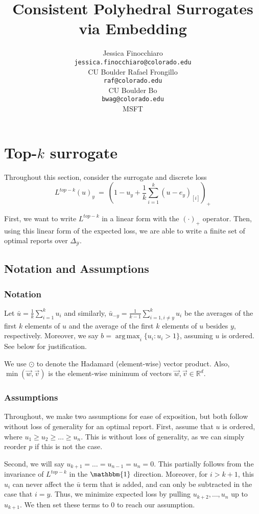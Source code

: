 \documentclass[12pt]{article}
\title{Consistent Polyhedral Surrogates via Embedding}
\author{%
 Jessica Finocchiaro\raf{Jessie?} \\
 \texttt{jessica.finocchiaro@colorado.edu}\\
 CU Boulder
 \And
 Rafael Frongillo\\
 \texttt{raf@colorado.edu}\\
 CU Boulder
 \And
 Bo\\
 \texttt{bwag@colorado.edu}\\
 MSFT
}
\newcommand{\reals}{\mathbb{R}}
\newcommand{\simplex}{\Delta_\Y}
\newcommand{\Y}{\mathcal{Y}}
\newcommand{\ones}{\mathbbm{1}}
\DeclareMathOperator*{\argmax}{arg\,max}
\begin{document}
\section{Top-$k$ surrogate}
Throughout this section, consider the surrogate and discrete loss \begin{equation}\label{eq:top-k-surrogate}
L^{top-k}(u)_y~=~\left(1 - u_y + \frac{1}{k} \sum_{i=1}^k (u - e_y)_{[i]} \right)_+
\end{equation}

First, we want to write $L^{top-k}$ in a linear form with the $(\cdot)_+$ operator.
Then, using this linear form of the expected loss, we are able to write a finite set of optimal reports over $\simplex$.

\subsection{Notation and Assumptions}
\subsubsection{Notation}
Let $\bar{u} = \frac 1 k \sum_{i = 1}^k u_i$ and similarly, $\bar{u}_{-y} = \frac{1}{k-1} \sum_{i=1, i \neq y}^k u_i$ be the averages of the first $k$ elements of $u$ and the average of the first $k$ elements of $u$ besides $y$, respectively.
Moreover, we say $b = \argmax_i \{u_i : u_i > 1\}$, assuming $u$ is ordered.
See below for justification.

We use $\odot$ to denote the Hadamard (element-wise) vector product.
Also, $\min(\vec w, \vec v)$ is the element-wise minimum of vectors $\vec w, \vec v \in \reals^d$.

\subsubsection{Assumptions}
Throughout, we make two assumptions for ease of exposition, but both follow without loss of generality for an optimal report.  %
First, assume that $u$ is ordered, where $u_1 \geq u_2 \geq \ldots \geq u_n$.
This is without loss of generality, as we can simply reorder $p$ if this is not the case.

Second, we will say $u_{k+1} = \ldots = u_{n-1} = u_n = 0$.
This partially follows from the invariance of $L^{top-k}$ in the $\ones$ direction.
Moreover, for $i > k+1$, this $u_i$ can never affect the $\bar{u}$ term that is added, and can only be subtracted in the case that $i = y$.
Thus, we minimize expected loss by pulling $u_{k+2},\ldots, u_n$ up to $u_{k+1}$.
We then set these terms to $0$ to reach our assumption.
\end{document}
